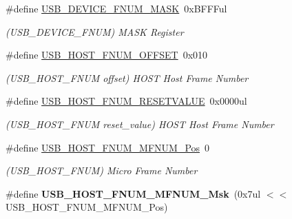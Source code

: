 \begin{DoxyCompactItemize}
\item 
\hypertarget{group___s_a_m_l21___u_s_b_gad6cee6d05cad83e842699860046a84ba}{}\#define \hyperlink{group___s_a_m_l21___u_s_b_gad6cee6d05cad83e842699860046a84ba}{U\+S\+B\+\_\+\+D\+E\+V\+I\+C\+E\+\_\+\+F\+N\+U\+M\+\_\+\+M\+A\+S\+K}~0x\+B\+F\+F\+Ful\label{group___s_a_m_l21___u_s_b_gad6cee6d05cad83e842699860046a84ba}

\begin{DoxyCompactList}\small\item\em (U\+S\+B\+\_\+\+D\+E\+V\+I\+C\+E\+\_\+\+F\+N\+U\+M) M\+A\+S\+K Register \end{DoxyCompactList}\item 
\hypertarget{group___s_a_m_l21___u_s_b_ga956a6cc1ba4f7ab7d03b158488e11745}{}\#define \hyperlink{group___s_a_m_l21___u_s_b_ga956a6cc1ba4f7ab7d03b158488e11745}{U\+S\+B\+\_\+\+H\+O\+S\+T\+\_\+\+F\+N\+U\+M\+\_\+\+O\+F\+F\+S\+E\+T}~0x010\label{group___s_a_m_l21___u_s_b_ga956a6cc1ba4f7ab7d03b158488e11745}

\begin{DoxyCompactList}\small\item\em (U\+S\+B\+\_\+\+H\+O\+S\+T\+\_\+\+F\+N\+U\+M offset) H\+O\+S\+T Host Frame Number \end{DoxyCompactList}\item 
\hypertarget{group___s_a_m_l21___u_s_b_gac63db08640743ea5ea2ad1d338d75d12}{}\#define \hyperlink{group___s_a_m_l21___u_s_b_gac63db08640743ea5ea2ad1d338d75d12}{U\+S\+B\+\_\+\+H\+O\+S\+T\+\_\+\+F\+N\+U\+M\+\_\+\+R\+E\+S\+E\+T\+V\+A\+L\+U\+E}~0x0000ul\label{group___s_a_m_l21___u_s_b_gac63db08640743ea5ea2ad1d338d75d12}

\begin{DoxyCompactList}\small\item\em (U\+S\+B\+\_\+\+H\+O\+S\+T\+\_\+\+F\+N\+U\+M reset\+\_\+value) H\+O\+S\+T Host Frame Number \end{DoxyCompactList}\item 
\hypertarget{group___s_a_m_l21___u_s_b_ga4f0798badf86adfa80aede8433e5cce4}{}\#define \hyperlink{group___s_a_m_l21___u_s_b_ga4f0798badf86adfa80aede8433e5cce4}{U\+S\+B\+\_\+\+H\+O\+S\+T\+\_\+\+F\+N\+U\+M\+\_\+\+M\+F\+N\+U\+M\+\_\+\+Pos}~0\label{group___s_a_m_l21___u_s_b_ga4f0798badf86adfa80aede8433e5cce4}

\begin{DoxyCompactList}\small\item\em (U\+S\+B\+\_\+\+H\+O\+S\+T\+\_\+\+F\+N\+U\+M) Micro Frame Number \end{DoxyCompactList}\item 
\hypertarget{group___s_a_m_l21___u_s_b_gac6a1110412eaa8d3d92222011d0c3abc}{}\#define {\bfseries U\+S\+B\+\_\+\+H\+O\+S\+T\+\_\+\+F\+N\+U\+M\+\_\+\+M\+F\+N\+U\+M\+\_\+\+Msk}~(0x7ul $<$$<$ U\+S\+B\+\_\+\+H\+O\+S\+T\+\_\+\+F\+N\+U\+M\+\_\+\+M\+F\+N\+U\+M\+\_\+\+Pos)\label{group___s_a_m_l21___u_s_b_gac6a1110412eaa8d3d92222011d0c3abc}


\end{DoxyCompactItemize}
